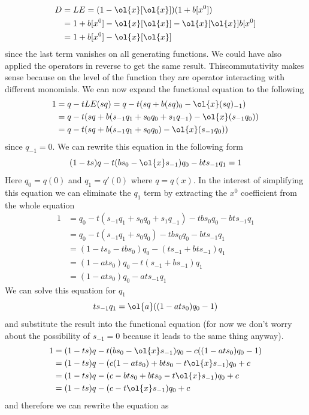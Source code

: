 \begin{align*}
	D &= LE = (1 - \ol{x}[\ol{x}])(1 + b[x^0]) \\
	&= 1 + b[x^0] - \ol{x}[\ol{x}]-\ol{x}[\ol{x}]b[x^0]\\
	&=1 + b[x^0] - \ol{x}[\ol{x}]
\end{align*}
since the last term vanishes on all generating functions. We could have also applied the operators in reverse to get the same result. Thiscommutativity  makes sense because on the level of the function they are operator interacting with different monomials. We can now expand the functional equation to the following
\begin{align*}
	1 &= q - tLE(sq) = q - t(sq + b(sq)_0 - \ol{x}(sq)_{-1}) \\
	&=  q - t(sq + b(s_{-1}q_1 + s_0q_0 + s_1 q_{-1}) - \ol{x}(s_{-1}q_0))\\
	&= q - t(sq + b(s_{-1}q_1 + s_0q_0) - \ol{x}(s_{-1}q_0))
\end{align*}
since $q_{-1} = 0$. We can rewrite this equation in the following form
\[
	(1-ts)q - t(bs_0-\ol{x}s_{-1})q_0 -bts_{-1}q_1 = 1
\]
Here $q_0 = q(0)$ and $q_1 = q'(0)$ where $q = q(x)$. In the interest of simplifying this equation we can eliminate the $q_1$ term by extracting the $x^0$ coefficient from the whole equation
\begin{align*}
	 1 &= q_0 - t(s_{-1}q_1 +s_0 q_0 + s_1 q_{-1}) - tbs_0q_0 - bts_{-1}q_1\\
	 &= q_0 - t(s_{-1}q_1 +s_0 q_0) - tbs_0q_0 - bts_{-1}q_1\\
	 &=(1-ts_0-tbs_0)q_0 - (ts_{-1}+bts_{-1})q_1\\
	 &= (1-ats_0)q_0-t(s_{-1}+bs_{-1})q_1\\
	 &=(1-ats_0)q_0-ats_{-1}q_1
\end{align*}
We can solve this equation for $q_1$
\[
	ts_{-1}q_1 = \ol{a}((1-ats_0)q_0-1)
\]
and substitute the result into the functional equation (for now we don't worry about the possibility of $s_{-1} = 0$ because it leads to the same thing anyway).
\begin{align*}
	1 &= (1-ts)q - t(bs_0-\ol{x}s_{-1})q_0 - c((1-ats_0)q_0-1)\\
	& = (1-ts)q - (c(1-ats_0)+ bts_0-t\ol{x}s_{-1})q_0 + c\\
	& = (1-ts)q - (c - bt s_0 + bt s_0-t\ol{x}s_{-1})q_0 + c \\
	& = (1-ts)q - (c -t\ol{x}s_{-1})q_0 + c \\
\end{align*}
and therefore we can rewrite the equation as
